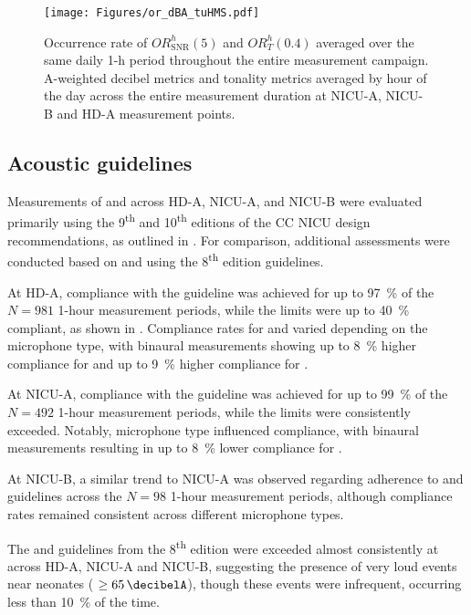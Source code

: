 \begin{figure}[h]
    \centering
    \texttt{[image: Figures/or\_dBA\_tuHMS.pdf]}
    \caption{Occurrence rate of $\textit{OR}^h_\text{SNR}(5)$ and $\textit{OR}_{T}^h(0.4)$ averaged over the same daily 1-h period throughout the entire measurement campaign. A-weighted decibel metrics and tonality metrics averaged by hour of the day across the entire measurement duration at NICU-A, NICU-B and HD-A measurement points.}
    \label{fig:ORbyhour}
\end{figure}


\subsection{Acoustic guidelines}

Measurements of  and  across HD-A, NICU-A, and NICU-B were evaluated primarily using the 9\textsuperscript{th} and 10\textsuperscript{th} editions of the CC NICU design recommendations, as outlined in . For comparison, additional assessments were conducted based on  and  using the 8\textsuperscript{th} edition guidelines.

At HD-A, compliance with the  guideline was achieved for up to \SI{97}{\percent} of the $N=981$ 1-hour measurement periods, while the  limits were up to \SI{40}{\percent} compliant, as shown in . Compliance rates for  and  varied depending on the microphone type, with binaural measurements showing up to \SI{8}{\percent} higher compliance for  and up to \SI{9}{\percent} higher compliance for .

At NICU-A, compliance with the  guideline was achieved for up to \SI{99}{\percent} of the $N=492$ 1-hour measurement periods, while the  limits were consistently exceeded. Notably, microphone type influenced compliance, with binaural measurements resulting in up to \SI{8}{\percent} lower compliance for .

At NICU-B, a similar trend to NICU-A was observed regarding adherence to  and  guidelines across the $N=98$ 1-hour measurement periods, although compliance rates remained consistent across different microphone types.

The  and  guidelines from the 8\textsuperscript{th} edition were exceeded almost consistently at across HD-A, NICU-A and NICU-B, suggesting the presence of very loud events near neonates ( $\ge \SI{65}{\decibelA}$), though these events were infrequent, occurring less than \SI{10}{\percent} of the time. 


